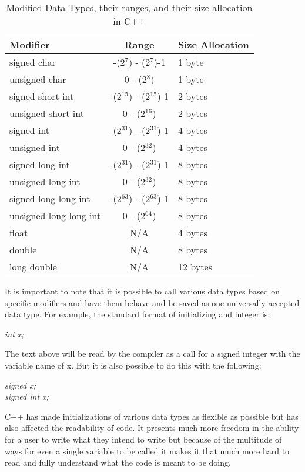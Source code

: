 \documentclass[12pt]{article}
\begin{document}
\begin{table}[h!]
  \begin{center}
    \caption{Modified Data Types, their ranges, and their size allocation in C++}
    \label{table:DT2}
    \begin{tabular}{|l|c|l|}
      \toprule %
      \textbf{Modifier} & \textbf{Range} & \textbf{Size Allocation}\\
      \midrule %
      signed char & -(2$^7$) - (2$^7$)-1 & 1 byte \\ 
      \hline
      unsigned char & 0 - (2$^8$) & 1 byte \\
      \hline
      signed short int & -(2$^15$) - (2$^15$)-1 & 2 bytes \\
      \hline
      unsigned short int & 0 - (2$^16$) & 2 bytes \\
      \hline
      signed int & -(2$^31$) - (2$^31$)-1 & 4 bytes\\
      \hline
      unsigned int & 0 - (2$^32$) & 4 bytes\\
      \hline
      signed long int & -(2$^31$) - (2$^31$)-1 & 8 bytes\\
      \hline
      unsigned long int & 0 - (2$^32$) & 8 bytes\\
      \hline
      signed long long int & -(2$^63$) - (2$^63$)-1 & 8 bytes\\
      \hline
      unsigned long long int & 0 - (2$^64$) & 8 bytes\\
      \hline
      float & N/A & 4 bytes\\
      \hline
      double & N/A & 8 bytes \\
      \hline
      long double & N/A & 12 bytes \\
      \bottomrule
    \end{tabular}
  \end{center}
\end{table}

It is important to note that it is possible to call various data types based on specific modifiers and have them behave and be saved as one universally accepted data type. For example, the standard format of initializing and integer is: \\ 
\begin{center}
  \textit{int x;}
\end{center}
The text above will be read by the compiler as a call for a signed integer with the variable name of x. But it is also possible to do this with the following:\\
\begin{center}
  \textit{signed x;\\signed int x;}
\end{center}
C++ has made initializations of various data types as flexible as possible but has also affected the readability of code. It presents much more freedom in the ability for a user to write what they intend to write but because of the multitude of ways for even a single variable to be called it makes it that much more hard to read and fully understand what the code is meant to be doing.
\end{document}
